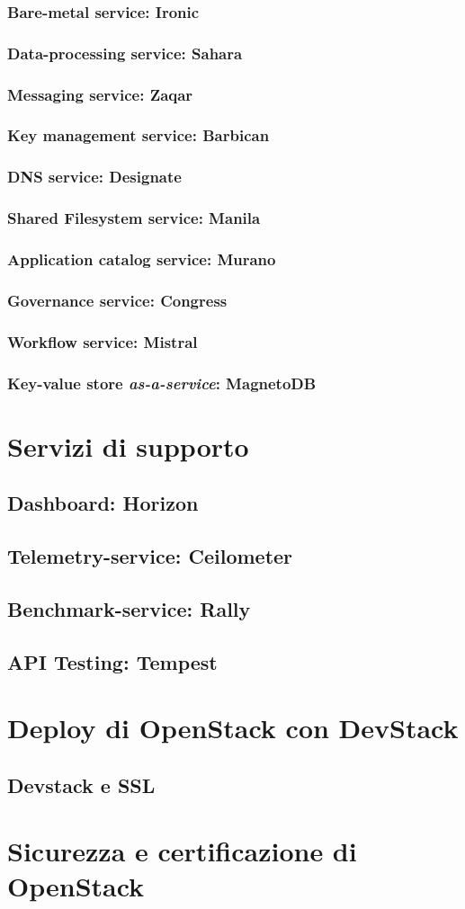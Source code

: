 \subsubsection{Bare-metal service: Ironic}
\subsubsection{Data-processing service: Sahara}
\subsubsection{Messaging service: Zaqar}
\subsubsection{Key management service: Barbican}
\subsubsection{DNS service: Designate}
\subsubsection{Shared Filesystem service: Manila}
\subsubsection{Application catalog service: Murano}
\subsubsection{Governance service: Congress}
\subsubsection{Workflow service: Mistral}
\subsubsection{Key-value store \textit{as-a-service}: MagnetoDB}

\section{Servizi di supporto}
\subsection{Dashboard: Horizon}
\subsection{Telemetry-service: Ceilometer}
\subsection{Benchmark-service: Rally}
\subsection{API Testing: Tempest}
\section{Deploy di OpenStack con DevStack}
\subsection{Devstack e SSL}
\section{Sicurezza e certificazione di OpenStack}